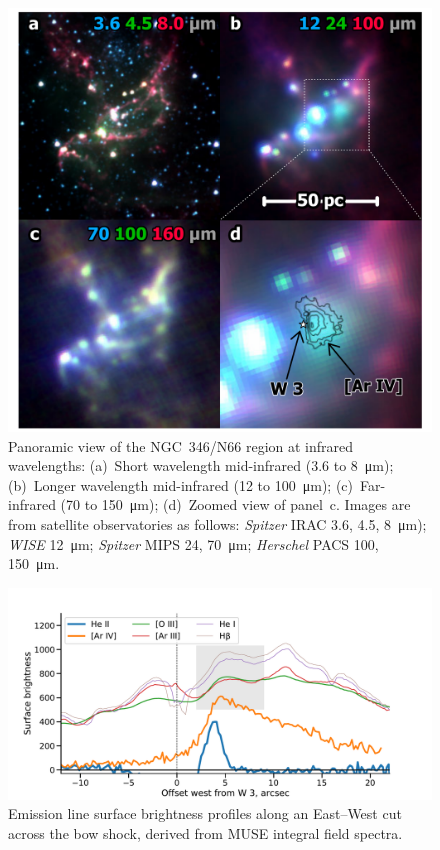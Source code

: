 \documentclass[twocolumn, times]{aastex631}
\begin{document}
\begin{figure}
  \centering
  \includegraphics[width=\linewidth]{figs/ngc346-infrared-multipanel}
  \caption{
    Panoramic view of the NGC~346/N66 region at infrared wavelengths:
    (a)~Short wavelength mid-infrared (\num{3.6} to \SI{8}{\um});
    (b)~Longer wavelength mid-infrared (\num{12} to \SI{100}{\um});
    (c)~Far-infrared (\num{70} to \SI{150}{\um});
    (d)~Zoomed view of panel~c.
    Images are from satellite observatories as follows:
    \textit{Spitzer} IRAC \num{3.6}, \num{4.5}, \SI{8}{\um});
    \textit{WISE} \SI{12}{\um};
    \textit{Spitzer} MIPS \num{24}, \SI{70}{\um};
    \textit{Herschel} PACS \num{100}, \SI{150}{\um}.
    }
  \label{fig:infrared-multipanel}
\end{figure}

\begin{figure}[p]
  \centering
  \includegraphics[width=0.9\linewidth]{figs/ngc346-bow-shock-brightness-cuts}
  \caption{
    Emission line surface brightness profiles along an East--West cut across the bow shock,
    derived from MUSE integral field spectra. 
    }
  \label{fig:brightness-cuts}
\end{figure}
\end{document}
